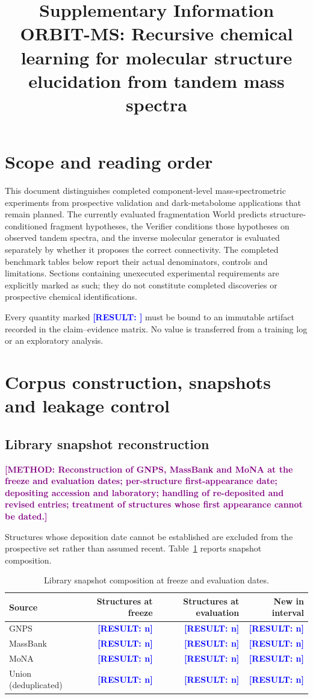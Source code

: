 \documentclass[12pt]{article}
\title{\textbf{Supplementary Information}\\[4pt]
\large ORBIT-MS: Recursive chemical learning for molecular structure elucidation from tandem mass spectra}
\author{}
\date{}
\newcommand{\result}[1]{\textbf{\textcolor{blue}{[RESULT: #1]}}}
\newcommand{\methodtodo}[1]{\textbf{\textcolor{purple}{[METHOD: #1]}}}
\begin{document}
\maketitle

\tableofcontents
\newpage

\section{Scope and reading order}

This document distinguishes completed component-level mass-spectrometric experiments from prospective validation and dark-metabolome applications that remain planned. The currently evaluated fragmentation World predicts structure-conditioned fragment hypotheses, the Verifier conditions those hypotheses on observed tandem spectra, and the inverse molecular generator is evaluated separately by whether it proposes the correct connectivity. The completed benchmark tables below report their actual denominators, controls and limitations. Sections containing unexecuted experimental requirements are explicitly marked as such; they do not constitute completed discoveries or prospective chemical identifications.

Every quantity marked \result{} must be bound to an immutable artifact recorded in the claim--evidence matrix. No value is transferred from a training log or an exploratory analysis.

\section{Corpus construction, snapshots and leakage control}

\subsection{Library snapshot reconstruction}
\methodtodo{Reconstruction of GNPS, MassBank and MoNA at the freeze and evaluation dates; per-structure first-appearance date; depositing accession and laboratory; handling of re-deposited and revised entries; treatment of structures whose first appearance cannot be dated.}

Structures whose deposition date cannot be established are excluded from the prospective set rather than assumed recent. Table~\ref{tab:snapshots} reports snapshot composition.

\begin{table}[h]
\centering
\caption{Library snapshot composition at freeze and evaluation dates.}
\label{tab:snapshots}
\begin{tabular}{lrrr}
\toprule
Source & Structures at freeze & Structures at evaluation & New in interval \\
\midrule
GNPS & \result{n} & \result{n} & \result{n} \\
MassBank & \result{n} & \result{n} & \result{n} \\
MoNA & \result{n} & \result{n} & \result{n} \\
Union (deduplicated) & \result{n} & \result{n} & \result{n} \\
\bottomrule
\end{tabular}
\end{table}
\end{document}

